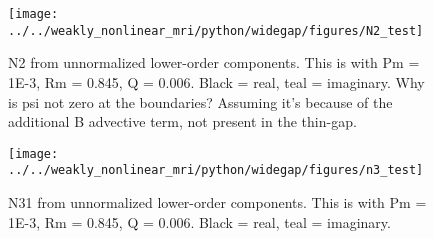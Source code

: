 \documentclass{paper}
\begin{document}
\begin{figure}[h!]
\centering
\texttt{[image: ../../weakly\_nonlinear\_mri/python/widegap/figures/N2\_test]}
\caption{N2 from unnormalized lower-order components. This is with Pm = 1E-3, Rm = 0.845, Q = 0.006. Black = real, teal = imaginary. Why is psi not zero at the boundaries? Assuming it's because of the additional B advective term, not present in the thin-gap.
\label{fig:N2}}
\end{figure}

\begin{figure}[h!]
\centering
\texttt{[image: ../../weakly\_nonlinear\_mri/python/widegap/figures/n3\_test]}
\caption{N31 from unnormalized lower-order components. This is with Pm = 1E-3, Rm = 0.845, Q = 0.006. Black = real, teal = imaginary. 
\label{fig:N31}}
\end{figure}
\end{document}
